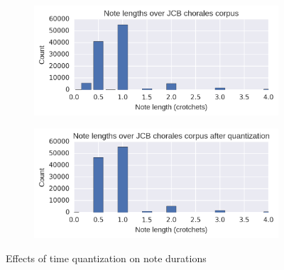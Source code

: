 \begin{figure}[htpb]
    \centering
    \begin{subfigure}[t]{0.48\textwidth}
        \centering
        \includegraphics[width=1.0\linewidth]{note-lengths-original.png}
    \end{subfigure}
    \begin{subfigure}[t]{0.48\textwidth}
        \centering
        \includegraphics[width=1.0\linewidth]{note-lengths-quantized.png}
    \end{subfigure}
    \caption{Effects of time quantization on note durations}
    \label{fig:note-lengths-time-quantization}
\end{figure}

